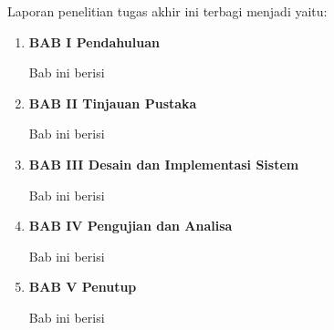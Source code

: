 Laporan penelitian tugas akhir ini terbagi menjadi \lipsum[1][1-3] yaitu:

\begin{enumerate}[nolistsep]

  \item \textbf{BAB I Pendahuluan}

        Bab ini berisi \lipsum[2][1-5]

        \vspace{2ex}

  \item \textbf{BAB II Tinjauan Pustaka}

        Bab ini berisi \lipsum[3][1-5]

        \vspace{2ex}

  \item \textbf{BAB III Desain dan Implementasi Sistem}

        Bab ini berisi \lipsum[4][1-5]

        \vspace{2ex}

  \item \textbf{BAB IV Pengujian dan Analisa}

        Bab ini berisi \lipsum[5][1-5]

        \vspace{2ex}

  \item \textbf{BAB V Penutup}

        Bab ini berisi \lipsum[6][1-5]

\end{enumerate}
